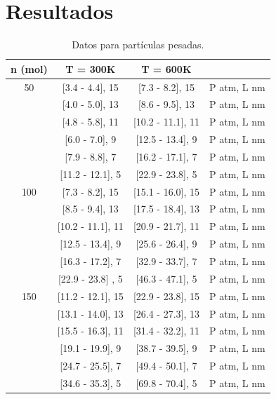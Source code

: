 \documentclass[]{article}
\begin{document}
\section{Resultados}



\begin{table}[h]
 \centering
 \begin{tabular}{|c|c|c|l|} \hline
  n (mol)&  T = 300K        &    T = 600K    &        \\ \hline
   50    & [3.4 - 4.4], 15 & [7.3 - 8.2], 15& P atm, L nm\\ 
         & [4.0 - 5.0], 13 & [8.6 - 9.5], 13& P atm, L nm\\
         & [4.8 - 5.8], 11 & [10.2 - 11.1], 11& P atm, L nm\\ 
         & [6.0 - 7.0],  9 & [12.5 - 13.4],  9& P atm, L nm\\ 
         & [7.9 - 8.8],  7 & [16.2 - 17.1],  7& P atm, L nm\\  
         & [11.2 - 12.1], 5 & [22.9 - 23.8],  5& P atm, L nm\\ \hline
   100   & [7.3 - 8.2], 15 & [15.1 - 16.0], 15& P atm, L nm\\ 
         & [8.5 - 9.4], 13 & [17.5 - 18.4], 13& P atm, L nm\\
         & [10.2 - 11.1], 11 & [20.9 - 21.7], 11& P atm, L nm\\ 
         & [12.5 - 13.4], 9 & [25.6 - 26.4],  9& P atm, L nm\\ 
         & [16.3 - 17.2], 7 & [32.9 - 33.7],  7& P atm, L nm\\  
         & [22.9 - 23.8] , 5 & [46.3 - 47.1],  5& P atm, L nm\\ \hline
   150   & [11.2 - 12.1], 15 & [22.9 - 23.8], 15& P atm, L nm\\ 
         & [13.1 - 14.0], 13 & [26.4 - 27.3], 13& P atm, L nm\\
         & [15.5 - 16.3], 11 & [31.4 - 32.2], 11& P atm, L nm\\ 
         & [19.1 - 19.9],  9 & [38.7 - 39.5],  9& P atm, L nm\\ 
         & [24.7 - 25.5],  7 & [49.4 - 50.1],  7& P atm, L nm\\  
         & [34.6 - 35.3],  5 & [69.8 - 70.4],  5& P atm, L nm\\ \hline

   

\end{tabular}
\caption{\label{tab:Pesadas} Datos para partículas pesadas.}
\end{table}
\end{document}
